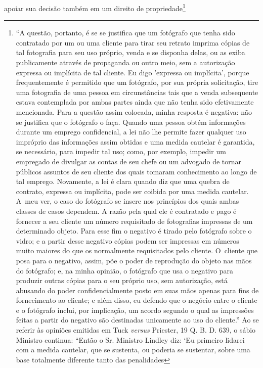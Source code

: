 apoiar sua decisão também em um direito de propriedade\footnote{``A
  questão, portanto, é se se justifica que um fotógrafo que tenha sido
  contratado por um ou uma cliente para tirar seu retrato imprima cópias
  de tal fotografia para seu uso próprio, venda e se disponha delas, ou
  as exiba publicamente através de propaganda ou outro meio, sem a
  autorização expressa ou implícita de tal cliente. Eu digo 'expressa ou
  implícita', porque frequentemente é permitido que um fotógrafo, por
  sua própria solicitação, tire uma fotografia de uma pessoa em
  circunstâncias tais que a venda subsequente estava contemplada por
  ambas partes ainda que não tenha sido efetivamente mencionada. Para a
  questão assim colocada, minha resposta é negativa: não se justifica
  que o fotógrafo o faça. Quando uma pessoa obtém informações durante um
  emprego confidencial, a lei não lhe permite fazer qualquer uso
  impróprio das informações assim obtidas e uma medida cautelar é
  garantida, se necessário, para impedir tal uso; como, por exemplo,
  impedir um empregado de divulgar as contas de seu chefe ou um advogado
  de tornar públicos assuntos de seu cliente dos quais tomaram
  conhecimento ao longo de tal emprego. Novamente, a lei é clara quando
  diz que uma quebra de contrato, expressa ou implícita, pode ser
  coibida por uma medida cautelar. A~meu ver, o caso do fotógrafo se
  insere nos princípios dos quais ambas classes de casos dependem. A
  razão pela qual ele é contratado e pago é fornecer a seu cliente um
  número requisitado de fotografias impressas de um determinado objeto.
  Para esse fim o negativo é tirado pelo fotógrafo sobre o vidro; e a
  partir desse negativo cópias podem ser impressas em números muito
  maiores do que os normalmente requisitados pelo cliente. O~cliente que
  posa para o negativo, assim, põe o poder de reprodução do objeto nas
  mãos do fotógrafo; e, na minha opinião, o fotógrafo que usa o negativo
  para produzir outras cópias para o seu próprio uso, sem autorização,
  está abusando do poder confidencialmente posto em suas mãos apenas
  para fins de fornecimento ao cliente; e além disso, eu defendo que o
  negócio entre o cliente e o fotógrafo inclui, por implicação, um
  acordo segundo o qual as impressões feitas a partir do negativo são
  destinadas unicamente ao uso do cliente.'' Ao se referir às opiniões
  emitidas em Tuck \emph{versus} Priester, 19 Q. B. D. 639, o sábio
  Ministro continua: ``Então o Sr. Ministro Lindley diz: `Eu primeiro
  lidarei com a medida cautelar, que se sustenta, ou poderia se
  sustentar, sobre uma base totalmente diferente tanto das penalidades
}
